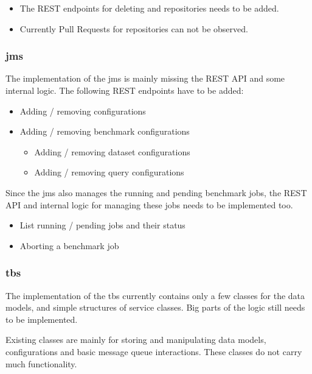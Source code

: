 \begin{itemize}
	\item The REST endpoints for deleting \gh{} and \dockh{} repositories needs to be added.
	
	\item Currently Pull Requests for \gh{} repositories can not be observed.
\end{itemize}


\subsubsection{\acl{jms}}
The implementation of the \acl{jms} is mainly missing the REST API and some internal logic.
The following REST endpoints have to be added:

\begin{itemize}
	\item Adding / removing \ts{} configurations
	
	\item Adding / removing benchmark configurations
		\begin{itemize}
			\item Adding / removing dataset configurations
			
			\item Adding / removing query configurations
		\end{itemize}
\end{itemize}

Since the \ac{jms} also manages the running and pending benchmark jobs, the REST API and internal logic for managing these jobs needs to be implemented too.

\begin{itemize}
	\item List running / pending jobs and their status
	
	\item Aborting a benchmark job
\end{itemize}



\subsubsection{\acl{tbs}}
The implementation of the \acl{tbs} currently contains only a few classes for the data models, and simple structures of service classes.
Big parts of the logic still needs to be implemented.

Existing classes are mainly for storing and manipulating data models, configurations and basic message queue interactions.
These classes do not carry much functionality.

